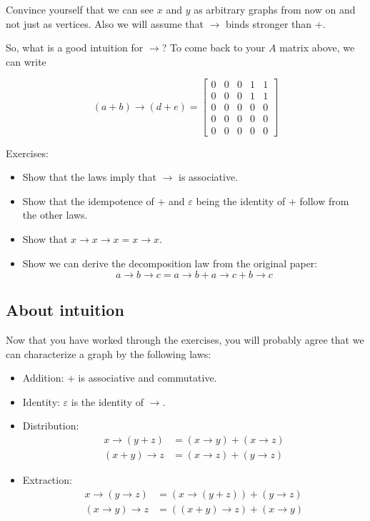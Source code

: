 \documentclass[a4paper,twocolumn]{article}
\begin{document}
Convince yourself that we can see $x$ and $y$ as arbitrary graphs from now on and not just as vertices.
Also we will assume that $\xrightarrow{}$ binds stronger than $+$.

So, what is a good intuition for $\xrightarrow{}$? To come back to your $A$ matrix above, we can write

\[ (a + b) \xrightarrow{} (d + e) = 
\begin{bmatrix}
  0 & 0 & 0 & 1 & 1 \\
  0 & 0 & 0 & 1 & 1 \\
  0 & 0 & 0 & 0 & 0 \\
  0 & 0 & 0 & 0 & 0 \\
  0 & 0 & 0 & 0 & 0
\end{bmatrix}
\]

Exercises:
\begin{itemize}
\item Show that the laws imply that $\xrightarrow{}$ is associative.
\item Show that the idempotence of $+$ and $\varepsilon$ being the identity of $+$ follow from the other laws.
\item Show that $x \xrightarrow{} x \xrightarrow{} x = x \xrightarrow{} x$.
\item Show we can derive the decomposition law from the original paper:
  \[ a \xrightarrow{} b \xrightarrow{} c = a \rightarrow{} b + a \xrightarrow{} c + b \xrightarrow{} c \]
\end{itemize}

\subsection{About intuition}

Now that you have worked through the exercises, you will probably agree
that we can characterize a graph by the following laws:
\begin{itemize}
\item Addition: $+$ is associative and commutative.
\item Identity: $\varepsilon$ is the identity of $\xrightarrow{}$.
\item Distribution:
  \begin{align*} 
    x \xrightarrow{} (y + z) &= (x \xrightarrow{} y) + (x \xrightarrow{} z) \\
    (x + y) \xrightarrow{} z &= (x \xrightarrow{} z) + (y \xrightarrow{} z)
  \end{align*}
\item Extraction:
  \begin{align*}
    x \xrightarrow{} (y \xrightarrow{} z) &= (x \xrightarrow{} (y + z)) + (y \xrightarrow{} z) \\
    (x \xrightarrow{} y) \xrightarrow{} z &= ((x + y) \xrightarrow{} z) + (x \xrightarrow{} y)
  \end{align*}
\end{itemize}
\end{document}
